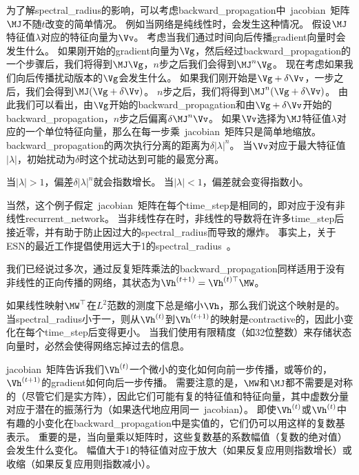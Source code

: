 为了解\gls{spectral_radius}的影响，可以考虑\gls{backward_propagation}中~\gls{jacobian}~矩阵$\MJ$不随$t$改变的简单情况。
例如当网络是纯线性时，会发生这种情况。
假设$\MJ$特征值$\lambda$对应的特征向量为$\Vv$。
考虑当我们通过时间向后传播\gls{gradient}向量时会发生什么。
如果刚开始的\gls{gradient}向量为$\Vg$，然后经过\gls{backward_propagation}的一个步骤后，我们将得到$\MJ \Vg$，$n$步之后我们会得到$\MJ^n \Vg$。
现在考虑如果我们向后传播扰动版本的$\Vg$会发生什么。
如果我们刚开始是$\Vg + \delta \Vv$，一步之后，我们会得到$\MJ(\Vg + \delta \Vv)$。
$n$步之后，我们将得到$\MJ^n(\Vg + \delta \Vv)$。
由此我们可以看出，由$\Vg$开始的\gls{backward_propagation}和由$\Vg+\delta \Vv$开始的\gls{backward_propagation}，$n$步之后偏离$\delta \MJ^n \Vv$。
如果$\Vv$选择为$\MJ$特征值$\lambda$对应的一个单位特征向量，那么在每一步乘~\gls{jacobian}~矩阵只是简单地缩放。
\gls{backward_propagation}的两次执行分离的距离为$\delta | \lambda |^n$。
当$\Vv$对应于最大特征值$|\lambda|$，初始扰动为$\delta$时这个扰动达到可能的最宽分离。

当$ | \lambda | > 1$，偏差$\delta | \lambda |^n$就会指数增长。
当$ | \lambda | < 1$，偏差就会变得指数小。


当然，这个例子假定~\gls{jacobian}~矩阵在每个\gls{time_step}是相同的，即对应于没有非线性\gls{recurrent_network}。
当非线性存在时，非线性的导数将在许多\gls{time_step}后接近零，并有助于防止因过大的\gls{spectral_radius}而导致的爆炸。
事实上，关于\gls{ESN}的最近工作提倡使用远大于1的\gls{spectral_radius}~\citep{yildiz2012re,jaeger2012long}。

我们已经说过多次，通过反复矩阵乘法的\gls{backward_propagation}同样适用于没有非线性的正向传播的网络，其状态为$\Vh^{(t+1)} = \Vh^{(t)\top} \MW $。

如果线性映射$\MW^\top$在$L^2$范数的测度下总是缩小$\Vh$，那么我们说这个映射是的。
当\gls{spectral_radius}小于一，则从$\Vh^{(t)}$到$\Vh^{(t+1)}$的映射是\gls{contractive}的，因此小变化在每个\gls{time_step}后变得更小。
当我们使用有限精度（如32位整数）来存储状态向量时，必然会使得网络忘掉过去的信息。

\gls{jacobian}~矩阵告诉我们$\Vh^{(t)}$一个微小的变化如何向前一步传播，或等价的，$\Vh^{(t+1)}$的\gls{gradient}如何向后一步传播。
需要注意的是，$\MW$和$\MJ$都不需要是对称的（尽管它们是实方阵），因此它们可能有复的特征值和特征向量，其中虚数分量对应于潜在的振荡行为（如果迭代地应用同一~\gls{jacobian}）。
即使$\Vh^{(t)}$或$\Vh^{(t)}$中有趣的小变化在\gls{backward_propagation}中是实值的，它们仍可以用这样的复数基表示。
重要的是，当向量乘以矩阵时，这些复数基的系数幅值（复数的绝对值）会发生什么变化。
幅值大于1的特征值对应于放大（如果反复应用则指数增长）或收缩（如果反复应用则指数减小）。

